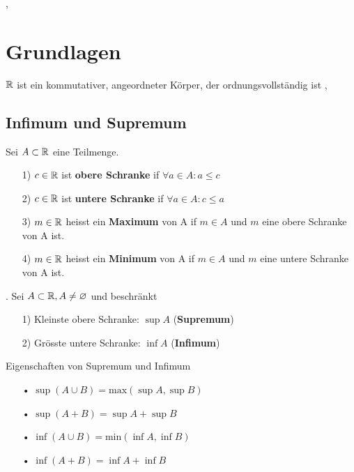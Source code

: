 \sep
\section{Grundlagen}
\Satz[1.1.2]  $\mathbb{R}$ ist ein kommutativer, angeordneter Körper, der ordnungsvollständig ist
\sep

\subsection{Infimum und Supremum}
\Def[1.1.12]  Sei $A \subset \mathbb{R}$ eine Teilmenge.
\begin{enumerate}
\item[1)]  $c \in \mathbb{R}$ ist \textbf{obere Schranke} if  $\forall a \in A: a \leqslant c$
\item[2)]  $c \in \mathbb{R}$ ist \textbf{untere Schranke} if $\forall a \in A: c \leqslant a$
\item[3)] $m \in \mathbb{R}$ heisst ein \textbf{Maximum} von A if $m \in A$ und $m$ eine obere Schranke von A ist.
\item[4)] $m \in \mathbb{R}$ heisst ein \textbf{Minimum} von A if $m \in A$ und $m$ eine untere Schranke von A ist.  \\
\end{enumerate}

\Satz[1.1.15]. Sei $A \subset \mathbb{R}, A \neq \varnothing$ und beschränkt
\begin{enumerate}
\item[1)]  Kleinste obere Schranke: $\sup A$ (\textbf{Supremum})
\item[2)]  Grösste untere Schranke: $\inf A $ (\textbf{Infimum})  \\
\end{enumerate}

Eigenschaften von Supremum und Infimum
\begin{enumerate}
\item[•]  $\sup (A \cup B) = \text{max} (\sup A, \sup B)$
\item[•]  $\sup (A + B) = \sup A + \sup B$
\item[•]  $\inf (A \cup B) = \text{min} (\inf A, \inf B)$
\item[•]  $\inf (A + B) = \inf A + \inf B$
\end{enumerate}